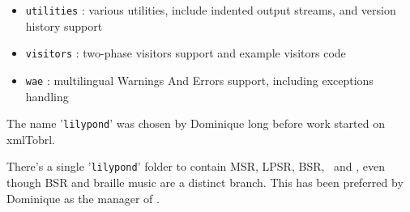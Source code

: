 \begin{itemize}
\item {\tt utilities} : various utilities, include indented output streams, and version history support

\item {\tt visitors} : two-phase visitors support and example visitors code

\item {\tt wae} : multilingual Warnings And Errors support, including exceptions handling

\end{itemize}

The name '{\tt lilypond}' was chosen by Dominique long before work started on \\xmlTobrl.

There's a single '{\tt lilypond}' folder to contain MSR, LPSR, BSR, \xmlToLy\ and \xmlToBrl, even though BSR and braille music are a distinct branch. This has been preferred by Dominique as the manager of \lib.
